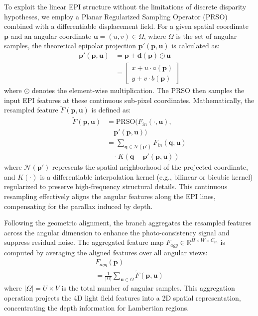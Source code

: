 \documentclass[lettersize,journal]{IEEEtran}
\begin{document}
To exploit the linear EPI structure without the limitations of discrete disparity hypotheses, we employ a Planar Regularized Sampling Operator (PRSO) combined with a differentiable displacement field. For a given spatial coordinate $\mathbf{p}$ and an angular coordinate $\mathbf{u} = (u,v) \in \Omega$, where $\Omega$ is the set of angular samples, the theoretical epipolar projection $\mathbf{p}'(\mathbf{p}, \mathbf{u})$ is calculated as:
\begin{equation}
\begin{aligned}
\mathbf{p}'(\mathbf{p}, \mathbf{u}) &= \mathbf{p} + \mathbf{d}(\mathbf{p}) \odot \mathbf{u} \\
&= \begin{bmatrix} x + u \cdot a(\mathbf{p}) \\ y + v \cdot b(\mathbf{p}) \end{bmatrix}
\end{aligned}
\end{equation}
where $\odot$ denotes the element-wise multiplication. The PRSO then samples the input EPI features at these continuous sub-pixel coordinates. Mathematically, the resampled feature $\tilde{F}(\mathbf{p}, \mathbf{u})$ is defined as:
\begin{equation}
\begin{aligned}
\tilde{F}(\mathbf{p}, \mathbf{u}) &= \text{PRSO}(F_{in}(\cdot, \mathbf{u}), \\
&\quad \mathbf{p}'(\mathbf{p}, \mathbf{u})) \\
&= \sum_{\mathbf{q} \in \mathcal{N}(\mathbf{p}')} F_{in}(\mathbf{q}, \mathbf{u}) \\
&\quad \cdot K(\mathbf{q} - \mathbf{p}'(\mathbf{p}, \mathbf{u}))
\end{aligned}
\end{equation}
where $\mathcal{N}(\mathbf{p}')$ represents the spatial neighborhood of the projected coordinate, and $K(\cdot)$ is a differentiable interpolation kernel (e.g., bilinear or bicubic kernel) regularized to preserve high-frequency structural details. This continuous resampling effectively aligns the angular features along the EPI lines, compensating for the parallax induced by depth.

Following the geometric alignment, the branch aggregates the resampled features across the angular dimension to enhance the photo-consistency signal and suppress residual noise. The aggregated feature map $F_{agg} \in \mathbb{R}^{H \times W \times C_{in}}$ is computed by averaging the aligned features over all angular views:
\begin{multline}

F_{agg}(\mathbf{p}) \\
= \frac{1}{|\Omega|} \sum_{\mathbf{u} \in \Omega} \tilde{F}(\mathbf{p}, \mathbf{u})
\end{multline}
where $|\Omega| = U \times V$ is the total number of angular samples. This aggregation operation projects the 4D light field features into a 2D spatial representation, concentrating the depth information for Lambertian regions.
\end{document}

